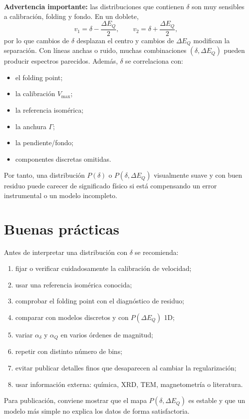 \documentclass[11pt,a4paper]{article}
\newcommand{\IS}{\delta}
\newcommand{\QS}{\Delta E_Q}
\begin{document}
\textbf{Advertencia importante:} las distribuciones que contienen $\IS$ son muy
sensibles a calibración, folding y fondo. En un doblete,
\begin{equation}
  v_1=\IS-\frac{\QS}{2},\qquad v_2=\IS+\frac{\QS}{2},
\end{equation}
por lo que cambios de $\IS$ desplazan el centro y cambios de $\QS$ modifican la
separación. Con líneas anchas o ruido, muchas combinaciones $(\IS,\QS)$ pueden
producir espectros parecidos. Además, $\IS$ se correlaciona con:
\begin{itemize}
  \item el folding point;
  \item la calibración $V_{\max}$;
  \item la referencia isomérica;
  \item la anchura $\Gamma$;
  \item la pendiente/fondo;
  \item componentes discretas omitidas.
\end{itemize}
Por tanto, una distribución $P(\IS)$ o $P(\IS,\QS)$ visualmente suave y con buen
residuo puede carecer de significado físico si está compensando un error
instrumental o un modelo incompleto.

\section{Buenas prácticas}

Antes de interpretar una distribución con $\IS$ se recomienda:
\begin{enumerate}
  \item fijar o verificar cuidadosamente la calibración de velocidad;
  \item usar una referencia isomérica conocida;
  \item comprobar el folding point con el diagnóstico de residuo;
  \item comparar con modelos discretos y con $P(\QS)$ 1D;
  \item variar $\alpha_{\IS}$ y $\alpha_Q$ en varios órdenes de magnitud;
  \item repetir con distinto número de bins;
  \item evitar publicar detalles finos que desaparecen al cambiar la
  regularización;
  \item usar información externa: química, XRD, TEM, magnetometría o literatura.
\end{enumerate}
Para publicación, conviene mostrar que el mapa $P(\IS,\QS)$ es estable y que un
modelo más simple no explica los datos de forma satisfactoria.
\end{document}
